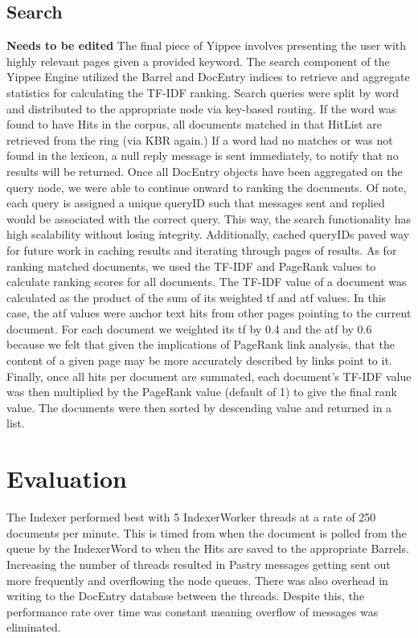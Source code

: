 \documentclass[11pt, letterpaper, oneside, twocolumn]{article}
\begin{document}
\subsection{Search}
\textbf{Needs to be edited}
The final piece of Yippee involves presenting the user with highly relevant pages given a provided keyword.
The search component of the Yippee Engine utilized the Barrel and DocEntry indices to retrieve and aggregate statistics for calculating the TF-IDF ranking. 
Search queries were split by word and distributed to the appropriate node via key-based routing. 
If the word was found to have Hits in the corpus, all documents matched in that HitList are retrieved from the ring (via KBR again.) 
If a word had no matches or was not found in the lexicon, a null reply message is sent immediately, to notify that no results will be returned. 
Once all DocEntry objects have been aggregated on the query node, we were able to continue onward to ranking the documents. 
Of note, each query is assigned a unique queryID such that messages sent and replied would be associated with the correct query. 
This way, the search functionality has high scalability without losing integrity. 
Additionally, cached queryIDs paved way for future work in caching results and iterating through pages of results.
As for ranking matched documents, we used the TF-IDF and PageRank values to calculate ranking scores for all documents. 
The TF-IDF value of a document was calculated as the product of the sum of its weighted tf and atf values. 
In this case, the atf values were anchor text hits from other pages pointing to the current document. For each document we weighted its tf by 0.4 and the atf by 0.6 because we felt that given the implications of PageRank link analysis, that the content of a given page may be more accurately described by links point to it. 
Finally, once all hits per document are summated, each document's TF-IDF value was then multiplied by the PageRank value (default of 1) to give the final rank value. 
The documents were then sorted by descending value and returned in a list. 

\section{Evaluation}
\label{sec:evaluation}

The Indexer performed best with 5 IndexerWorker threads at a rate of 250 documents per minute. 
This is timed from when the document is polled from the queue by the IndexerWord to when the Hits are saved to the appropriate Barrels. 
Increasing the number of threads resulted in Pastry messages getting sent out more frequently and overflowing the node queues. 
There was also overhead in writing to the DocEntry database between the threads. 
Despite this, the performance rate over time was constant meaning overflow of messages was eliminated. 
\end{document}
